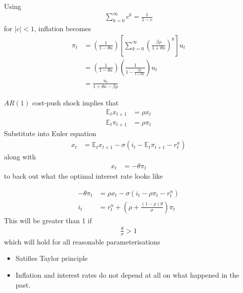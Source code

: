\documentclass{beamer}
\begin{document}
\begin{frame}
  Using
  \begin{align}
    \sum_{k=0}^{\infty}c^k=\frac{1}{1-c}
  \end{align}
for $|c|<1$, inflation becomes
\begin{align}
  \pi_t &= \left( \frac{1}{1-\theta\kappa} \right) \left[ \sum_{k=0}^{\infty} \left( \frac{\beta\rho}{1+\theta\kappa} \right)^k \right]u_t\\
  &= \left( \frac{1}{1-\theta\kappa} \right) \left( \frac{1}{1-\frac{\beta\rho}{1+\theta\kappa}} \right) u_t\\
  &= \frac{u_t}{1+\theta\kappa-\beta\rho}
\end{align}
\end{frame}
\begin{frame}
  $AR(1)$ cost-push shock implies that 
\begin{align}
  \mathbb{E}_tx_{t+1} &= \rho x_t\\
  \mathbb{E}_t \pi_{t+1} &= \rho \pi_t  
\end{align}
\medskip
Substitute into Euler equation 
\begin{align}
  x_t&=\mathbb{E}_t x_{t+1}-\sigma(i_t-\mathbb{E}_t \pi_{t+1}-r_t^n)
\end{align}
\medskip
along with
\begin{align}
  x_t&=-\theta\pi_t  
\end{align}
\medskip
to back out what the optimal interest rate looks like  
\end{frame}

\begin{frame}
  \begin{align}
  -\theta\pi_t &= \rho x_t-\sigma(i_t-\rho \pi_{t}-r_t^n) \\
  i_t&=r_t^n+ \left( \rho + \frac{(1-\rho)\theta}{\sigma} \right) \pi_t
\end{align}
\medskip
This will be greater than 1 if 
\begin{align}
 \frac{\theta}{\sigma}>1 
\end{align}
\medskip
 which will hold for all reasonable parameterisations
\begin{itemize}
   \item Satifies Taylor principle
   \item Inflation and interest rates do not depend at all on what happened in the past.
 \end{itemize} 
\end{frame}
\end{document}
